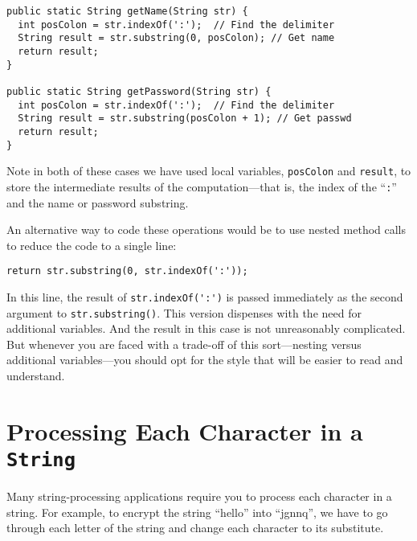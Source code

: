 \begin{jjjlisting}[27pc]
\begin{lstlisting}
public static String getName(String str) {
  int posColon = str.indexOf(':');  // Find the delimiter
  String result = str.substring(0, posColon); // Get name
  return result;
}

public static String getPassword(String str) {
  int posColon = str.indexOf(':');  // Find the delimiter
  String result = str.substring(posColon + 1); // Get passwd
  return result;
}
\end{lstlisting}
\end{jjjlisting}


\noindent Note in both of these cases we have used
local variables, {\tt posColon} and \mbox{\tt result}, to store the
intermediate results of the computation---that is, the index of the
``{\tt :}'' and the name or password substring.

An alternative way to code these operations would be to use nested
method calls to reduce the code to a single line:

\begin{jjjlisting}
\begin{lstlisting}
return str.substring(0, str.indexOf(':'));
\end{lstlisting}
\end{jjjlisting}

\noindent In this line, the result of {\tt str.indexOf(\verb!'!:\verb!'!)} is
passed immediately as the second argument to {\tt str.substring()}.
This version dispenses with the need for additional variables.
And the result in this case is not unreasonably complicated.
But whenever you are faced with a trade-off of this sort---nesting
versus additional variables---you should opt for the style that
will be easier to read and understand.



\section{Processing Each Character in a {\tt String}}
\noindent Many string-processing applications require you to process each
character in a string.  For example, to encrypt the string ``hello'' into
``jgnnq'', we have to go through each letter of the string and change
each character to its substitute.

